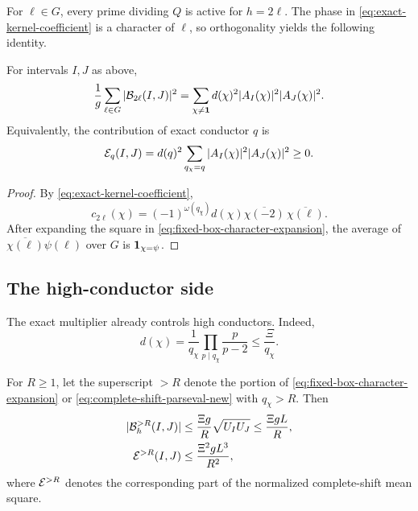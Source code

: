 For $\ell\in G$, every prime dividing $Q$ is active for $h=2\ell$.  The phase in \eqref{eq:exact-kernel-coefficient} is a character of $\ell$, so orthogonality yields the following identity.

\begin{proposition}\label{prop:complete-shift-parseval}
For intervals $I,J$ as above,
\begin{equation}\label{eq:complete-shift-parseval-new}
 \frac1g\sum_{\ell\in G}|\mathcal B_{2\ell}(I,J)|^2
 =\sum_{\chi\ne\mathbf 1}
 d(\chi)^2|A_I(\chi)|^2|A_J(\chi)|^2.
\end{equation}
Equivalently, the contribution of exact conductor $q$ is
\begin{equation}\label{eq:energy-exact-conductor}
 \mathcal E_q(I,J)
 =d(q)^2
 \sum_{q_\chi=q}|A_I(\chi)|^2|A_J(\chi)|^2
 \ge0.
\end{equation}
\end{proposition}

\begin{proof}
By \eqref{eq:exact-kernel-coefficient},
\[
 c_{2\ell}(\chi)
 =(-1)^{\omega(q_\chi)}d(\chi)
   \overline{\chi(-2)}\,\overline{\chi(\ell)}.
\]
After expanding the square in \eqref{eq:fixed-box-character-expansion}, the average of $\overline{\chi(\ell)}\psi(\ell)$ over $G$ is $\mathbf 1_{\chi=\psi}$.
\end{proof}

\subsection{The high-conductor side}

The exact multiplier already controls high conductors.  Indeed,
\begin{equation}\label{eq:dchi-high-conductor}
 d(\chi)
 =\frac1{q_\chi}\prod_{p\mid q_\chi}\frac p{p-2}
 \le\frac{\Xi}{q_\chi}.
\end{equation}

\begin{proposition}\label{prop:high-conductor-estimates}
For $R\ge1$, let the superscript $>R$ denote the portion of \eqref{eq:fixed-box-character-expansion} or \eqref{eq:complete-shift-parseval-new} with $q_\chi>R$.  Then
\begin{align}
 |\mathcal B_h^{>R}(I,J)|
  &\le\frac{\Xi g}{R}\sqrt{U_IU_J}
  \le\frac{\Xi gL}{R},\label{eq:fixed-high-conductor-bound}\\
 \mathcal E^{>R}(I,J)
  &\le\frac{\Xi^2gL^3}{R^2},\label{eq:shift-high-conductor-bound}
\end{align}
where $\mathcal E^{>R}$ denotes the corresponding part of the normalized complete-shift mean square.
\end{proposition}

